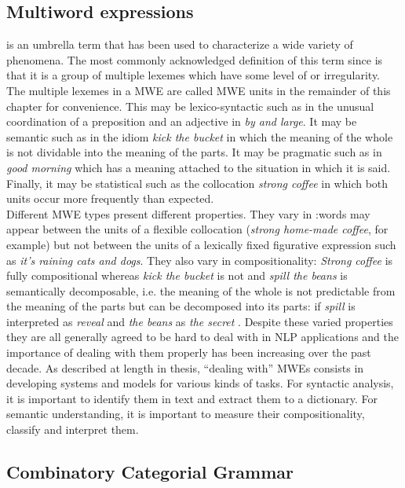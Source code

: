\documentclass[output=paper]{langsci/langscibook}
\begin{document}
\subsection{Multiword expressions}
\label{del:MWEs}
\indent {} is an umbrella term that has been used to characterize a wide variety of phenomena. The most commonly acknowledged definition of this term since \citet{sag02} is that it is a group of multiple lexemes which have some level of  or irregularity. The multiple lexemes in a MWE are called MWE units in the remainder of this chapter for convenience. This  may be lexico-syntactic such as in the unusual coordination of a preposition and an adjective in \textit{by and large}. It may be semantic such as in the idiom \textit{kick the bucket} in which the meaning of the whole is not dividable into the meaning of the parts. It may be pragmatic such as in \textit{good morning} which has a meaning attached to the situation in which it is said. Finally, it may be statistical such as the collocation \textit{strong coffee} in which both units occur more frequently than expected.\\
\indent Different MWE types present different properties. They vary in :\linebreak words may appear between the units of a flexible collocation (\textit{strong home-made coffee}, for example) but not between the units of a lexically fixed figurative expression such as \textit{it's raining cats and dogs}. They also vary in compositionality: \textit{Strong coffee} is fully compositional whereas \textit{kick the bucket} is not and \textit{spill the beans} is semantically decomposable, i.e. the meaning of the whole is not predictable from the meaning of the parts but can be decomposed into its parts: if \textit{spill} is interpreted as \textit{reveal} and \textit{the beans} as \textit{the secret} \citep{nunberg94}.
Despite these varied properties they are all generally agreed to be hard to deal with in NLP applications \citep{sag02} and the importance of dealing with them properly has been increasing over the past decade. As described at length in  thesis, ``dealing with'' MWEs consists in developing systems and models for various kinds of tasks. For syntactic analysis, it is important to identify them in text and extract them to a dictionary. For semantic understanding, it is important to measure their compositionality, classify and interpret them.


\subsection{Combinatory Categorial Grammar}\label{del:CCG}
\end{document}
